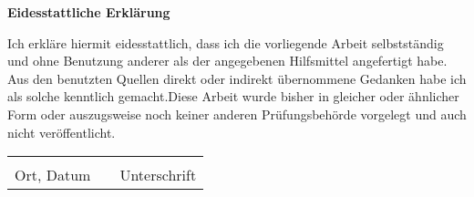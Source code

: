 \begin{center}
	\textbf{Eidesstattliche Erklärung}
\end{center}
Ich erkläre hiermit eidesstattlich, dass ich die vorliegende Arbeit selbstständig und ohne Benutzung anderer als der angegebenen Hilfsmittel angefertigt habe. Aus den benutzten Quellen direkt oder indirekt übernommene Gedanken habe ich als solche kenntlich gemacht.\newline Diese Arbeit wurde bisher in gleicher oder ähnlicher Form oder auszugsweise noch keiner anderen Prüfungsbehörde vorgelegt und auch nicht veröffentlicht.
\newline
\newline
\newline
\newline
\newline
\begin{tabular}{lp{2em}l}
	\hspace{6cm}   && \hspace{6cm} \\\cline{1-1}\cline{3-3}
	Ort, Datum     && Unterschrift
\end{tabular}
